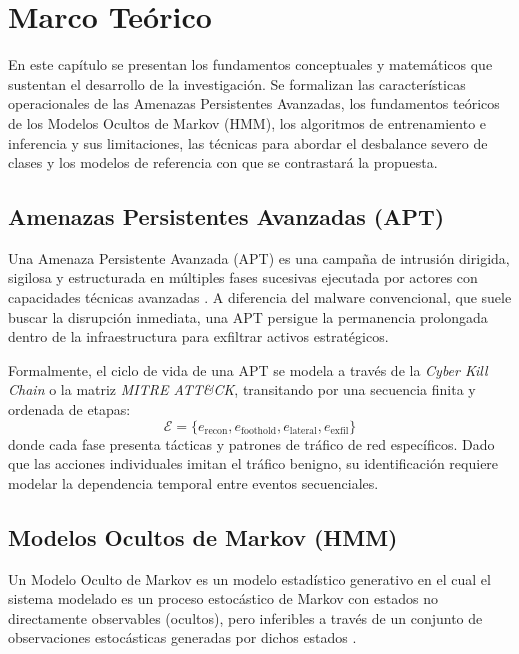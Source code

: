 \chapter{Marco Teórico}
En este capítulo se presentan los fundamentos conceptuales y matemáticos que sustentan el desarrollo de la investigación. Se formalizan las características operacionales de las Amenazas Persistentes Avanzadas, los fundamentos teóricos de los Modelos Ocultos de Markov (HMM), los algoritmos de entrenamiento e inferencia y sus limitaciones, las técnicas para abordar el desbalance severo de clases y los modelos de referencia con que se contrastará la propuesta.

\section{Amenazas Persistentes Avanzadas (APT)}
Una Amenaza Persistente Avanzada (APT) es una campaña de intrusión dirigida, sigilosa y estructurada en múltiples fases sucesivas ejecutada por actores con capacidades técnicas avanzadas \parencite{hutchins2011killchain}. A diferencia del malware convencional, que suele buscar la disrupción inmediata, una APT persigue la permanencia prolongada dentro de la infraestructura para exfiltrar activos estratégicos.

Formalmente, el ciclo de vida de una APT se modela a través de la \textit{Cyber Kill Chain} o la matriz \textit{MITRE ATT\&CK}, transitando por una secuencia finita y ordenada de etapas:
\begin{equation}
\mathcal{E} = \{e_{\text{recon}}, e_{\text{foothold}}, e_{\text{lateral}}, e_{\text{exfil}}\}
\end{equation}
donde cada fase presenta tácticas y patrones de tráfico de red específicos. Dado que las acciones individuales imitan el tráfico benigno, su identificación requiere modelar la dependencia temporal entre eventos secuenciales.

\section{Modelos Ocultos de Markov (HMM)}
Un Modelo Oculto de Markov es un modelo estadístico generativo en el cual el sistema modelado es un proceso estocástico de Markov con estados no directamente observables (ocultos), pero inferibles a través de un conjunto de observaciones estocásticas generadas por dichos estados \parencite{rabiner1989}.

